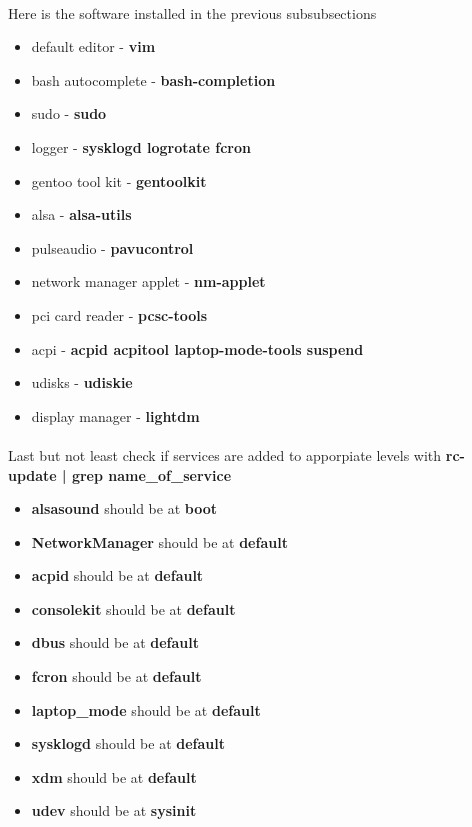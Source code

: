 \documentclass[10pt,a4paper]{article}
\begin{document}
                    \paragraph{} Here is the software installed in the previous subsubsections
                    \begin{itemize}
                        \item default editor - \textbf{vim}
                        \item bash autocomplete - \textbf{bash-completion}
                        \item sudo - \textbf{sudo}
                        \item logger - \textbf{sysklogd logrotate fcron}
                        \item gentoo tool kit - \textbf{gentoolkit}
                        \item alsa - \textbf{alsa-utils}
                        \item pulseaudio - \textbf{pavucontrol}
                        \item network manager applet - \textbf{nm-applet}
                        \item pci card reader - \textbf{pcsc-tools}
                        \item acpi - \textbf{acpid acpitool laptop-mode-tools suspend}
                        \item udisks - \textbf{udiskie}
                        \item display manager - \textbf{lightdm}
                    \end{itemize}

                    \paragraph{} Last but not least check if services are added to apporpiate levels with \textbf{rc-update | grep {name\_of\_service}}

                    \begin{itemize}
                        \item \textbf{alsasound} should be at \textbf{boot}
                        \item \textbf{NetworkManager} should be at \textbf{default}
                        \item \textbf{acpid} should be at \textbf{default}
                        \item \textbf{consolekit} should be at \textbf{default}
                        \item \textbf{dbus} should be at \textbf{default}
                        \item \textbf{fcron} should be at \textbf{default}
                        \item \textbf{laptop\_mode} should be at \textbf{default}
                        \item \textbf{sysklogd} should be at \textbf{default}
                        \item \textbf{xdm} should be at \textbf{default}
                        \item \textbf{udev} should be at \textbf{sysinit}
                    \end{itemize}
\end{document}
